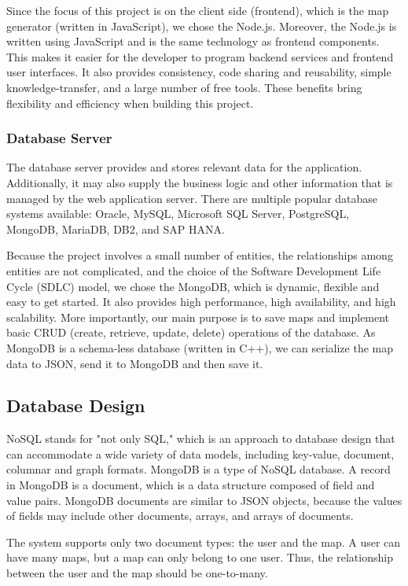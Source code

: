 Since the focus of this project is on the client side (frontend), which is the map generator (written in JavaScript), we chose the Node.js. Moreover, the Node.js is written using JavaScript and is the same technology as frontend components. This makes it easier for the developer to program backend services and frontend user interfaces. It also provides consistency, code sharing and reusability, simple knowledge-transfer, and a large number of free tools. These benefits bring flexibility and efficiency when building this project.

\subsubsection{Database Server}
\label{sec:Design>Architecture Design>Database Server}
The database server provides and stores relevant data for the application. Additionally, it may also supply the business logic and other information that is managed by the web application server. There are multiple popular database systems available: Oracle, MySQL, Microsoft SQL Server, PostgreSQL, MongoDB, MariaDB, DB2, and SAP HANA.

Because the project involves a small number of entities, the relationships among entities are not complicated, and the choice of the Software Development Life Cycle (SDLC) model, we chose the MongoDB, which is dynamic, flexible and easy to get started. It also provides high performance, high availability, and high scalability. More importantly, our main purpose is to save maps and implement basic CRUD (create, retrieve, update, delete) operations of the database. As MongoDB is a schema-less database (written in C++), we can serialize the map data to JSON, send it to MongoDB and then save it.

\subsection{Database Design}
\label{sec:Design>Database Design}
NoSQL stands for "not only SQL," which is an approach to database design that can accommodate a wide variety of data models, including key-value, document, columnar and graph formats. MongoDB is a type of NoSQL database. A record in MongoDB is a document, which is a data structure composed of field and value pairs. MongoDB documents are similar to JSON objects, because the values of fields may include other documents, arrays, and arrays of documents.

The system supports only two document types: the user and the map. A user can have many maps, but a map can only belong to one user. Thus, the relationship between the user and the map should be one-to-many.

